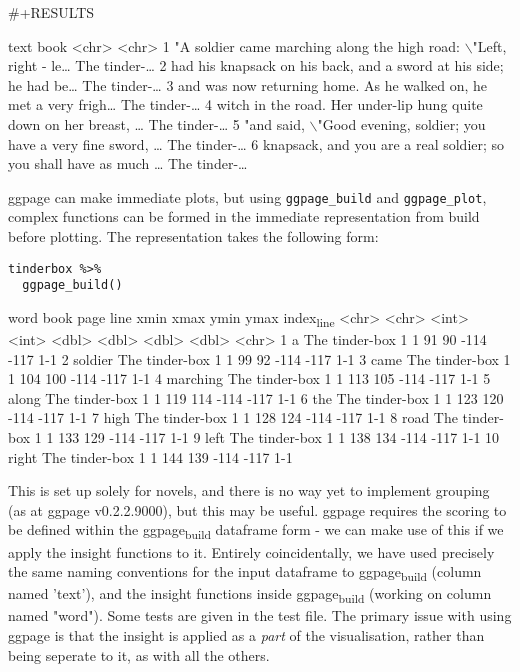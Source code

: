\documentclass[a4paper, 11pt]{article}
\begin{document}
\#+RESULTS

  text                                                              book        
  <chr>                                                             <chr>       
1 "A soldier came marching along the high road: $\backslash$"Left, right - le… The tinder-…
2 had his knapsack on his back, and a sword at his side; he had be… The tinder-…
3 and was now returning home. As he walked on, he met a very frigh… The tinder-…
4 witch in the road. Her under-lip hung quite down on her breast, … The tinder-…
5 "and said, $\backslash$"Good evening, soldier; you have a very fine sword, … The tinder-…
6 knapsack, and you are a real soldier; so you shall have as much … The tinder-…

ggpage can make immediate plots, but using \texttt{ggpage\_build} and
\texttt{ggpage\_plot}, complex functions can be formed in the immediate
representation from build before plotting. The representation takes
the following form:
\begin{verbatim}
tinderbox %>%
  ggpage_build() 
\end{verbatim}

   word     book            page  line  xmin  xmax  ymin  ymax index\textsubscript{line}
   <chr>    <chr>          <int> <int> <dbl> <dbl> <dbl> <dbl> <chr>     
 1 a        The tinder-box     1     1    91    90  -114  -117 1-1       
 2 soldier  The tinder-box     1     1    99    92  -114  -117 1-1       
 3 came     The tinder-box     1     1   104   100  -114  -117 1-1       
 4 marching The tinder-box     1     1   113   105  -114  -117 1-1       
 5 along    The tinder-box     1     1   119   114  -114  -117 1-1       
 6 the      The tinder-box     1     1   123   120  -114  -117 1-1       
 7 high     The tinder-box     1     1   128   124  -114  -117 1-1       
 8 road     The tinder-box     1     1   133   129  -114  -117 1-1       
 9 left     The tinder-box     1     1   138   134  -114  -117 1-1       
10 right    The tinder-box     1     1   144   139  -114  -117 1-1       

This is set up solely for novels, and there is no way yet to implement
grouping (as at ggpage v0.2.2.9000), but this may be useful. ggpage
requires the scoring to be defined within the ggpage\textsubscript{build} dataframe
form - we can make use of this if we apply the insight functions to
it. Entirely coincidentally, we have used precisely the same naming
conventions for the input dataframe to ggpage\textsubscript{build} (column named
'text'), and the insight functions inside ggpage\textsubscript{build} (working on
column named "word"). Some tests are given in the test file. The
primary issue with using ggpage is that the insight is applied as a
\emph{part} of the visualisation, rather than being seperate to it, as with
all the others.
\end{document}
